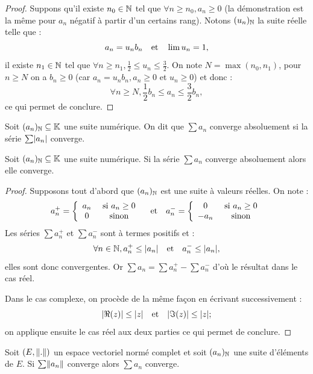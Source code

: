\documentclass[french]{article}
\begin{document}
\begin{proof}
Suppons qu'il existe $n_0 \in \mathbb{N}$ tel que $\forall n \geq n_0, a_n \geq 0$ (la démonstration est la même pour $a_n$ négatif à partir d'un
certains rang). Notons $(u_n)_{\mathbb{N}}$ la suite réelle telle que :
\[ a_n = u_n b_n \quad \text{et} \quad \lim u_n =1 ,\]
il existe $n_1 \in \mathbb{N}$ tel que $\forall n \geq n_1, \frac12 \leq u_n \leq \frac32$. On note $N = \max(n_0, n_1)$, pour $n \geq N$ on a 
$b_n \geq 0$ (car $a_n = u_n b_n, a_n \geq 0$ et $u_n \geq 0$) et donc :
\[ \forall n \geq N, \frac12 b_n \leq a_n \leq \frac32 b_n , \]
ce qui permet de conclure.
\end{proof}

\begin{defn}
Soit $(a_n)_{\mathbb{N}} \subseteq \mathbb{K}$ une suite numérique. On dit que $\sum a_n$ converge absoluement si la série $\sum \lvert a_n\rvert$ converge. 
\end{defn}

\begin{thm}
Soit $(a_n)_{\mathbb{N}} \subseteq \mathbb{K}$ une suite numérique. Si la série $\sum a_n$ converge absoluement alors elle converge.
\end{thm}

\begin{proof}
Supposons tout d'abord que $(a_n)_{\mathbb{N}}$ est une suite à valeurs réelles. On note :
\[ a_n^{+} = \left \{ \begin{array}{c c} a_n & \text{ si } a_n \geq 0 \\ 0 & \text{ sinon} \end{array} \right.
\quad \text{et} \quad a_n^{-} = \left \{ \begin{array}{c c} 0 & \text{ si } a_n \geq 0 \\ -a_n & \text{ sinon} \end{array} \right. \]
Les séries $\sum a_n^{+}$ et $\sum a_n^{-}$ sont à termes positifs et :
\[ \forall n \in \mathbb{N}, a_n^{+} \leq \lvert a_n\rvert \quad \text{et} \quad a_n^{-} \leq \lvert a_n\rvert , \]
elles sont donc convergentes. Or $\sum a_n = \sum a_n^{+}- \sum a_n^{-}$ d'où le résultat dans le cas réel. \newline

Dans le cas complexe, on procède de la même façon en écrivant successivement :
\[ \lvert\Re(z)\rvert \leq \lvert z\rvert \quad \text{et} \quad \lvert\Im(z)\rvert \leq \lvert z\rvert ; \]
on applique ensuite le cas réel aux deux parties ce qui permet de conclure.
\end{proof}

\begin{thm}[Généralisation]
Soit $(E, \lVert.\rVert)$ un espace vectoriel normé complet et soit $(a_n)_{\mathbb{N}}$ une suite d'éléments de $E$.
Si $\sum \lVert a_n\rVert$ converge alors $\sum a_n$ converge.
\end{thm}
\end{document}
